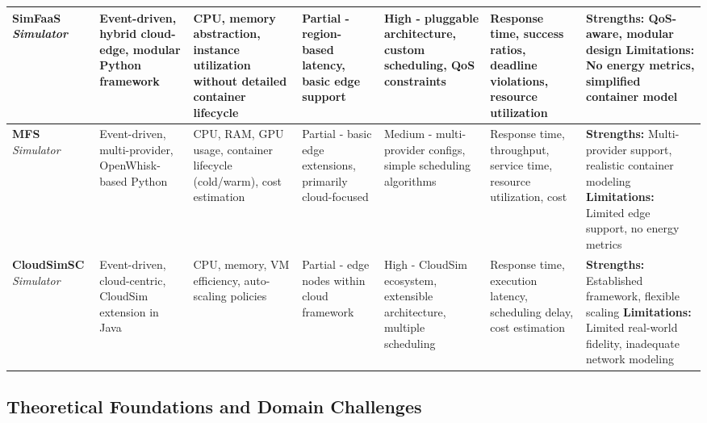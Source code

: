 \begin{landscape}
\begin{table}[htbp]
\begin{tabular}{|p{2.2cm}|p{3.8cm}|p{3.8cm}|p{2.5cm}|p{2.8cm}|p{3.2cm}|p{4.5cm}|}
\textbf{SimFaaS} \cite{mahmoudi2021simfaas} \newline \textit{Simulator} &
Event-driven, hybrid cloud-edge, modular Python framework &
CPU, memory abstraction, instance utilization without detailed container lifecycle &
Partial - region-based latency, basic edge support &
High - pluggable architecture, custom scheduling, QoS constraints &
Response time, success ratios, deadline violations, resource utilization &
\textbf{Strengths:} QoS-aware, modular design \newline \textbf{Limitations:} No energy metrics, simplified container model \\
\hline

\textbf{MFS} \cite{bermbach2019mfs} \newline \textit{Simulator} &
Event-driven, multi-provider, OpenWhisk-based Python &
CPU, RAM, GPU usage, container lifecycle (cold/warm), cost estimation &
Partial - basic edge extensions, primarily cloud-focused &
Medium - multi-provider configs, simple scheduling algorithms &
Response time, throughput, service time, resource utilization, cost &
\textbf{Strengths:} Multi-provider support, realistic container modeling \newline \textbf{Limitations:} Limited edge support, no energy metrics \\
\hline

\textbf{CloudSimSC} \cite{mampage2021cloudsimsc} \newline \textit{Simulator} &
Event-driven, cloud-centric, CloudSim extension in Java &
CPU, memory, VM efficiency, auto-scaling policies &
Partial - edge nodes within cloud framework &
High - CloudSim ecosystem, extensible architecture, multiple scheduling &
Response time, execution latency, scheduling delay, cost estimation &
\textbf{Strengths:} Established framework, flexible scaling \newline \textbf{Limitations:} Limited real-world fidelity, inadequate network modeling \\
\hline

\end{tabular}
\end{table}
\end{landscape}


\subsection{Theoretical Foundations and Domain Challenges}

